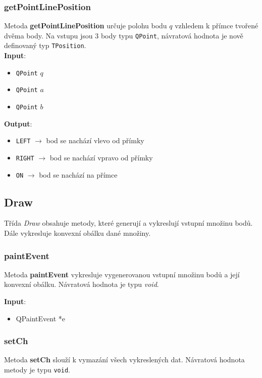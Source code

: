 \documentclass[a4paper, 12pt]{article}
\begin{document}
\subsubsection{getPointLinePosition}
Metoda \textbf{getPointLinePosition} určuje polohu bodu $q$ vzhledem k přímce tvořené dvěma body. Na vstupu jsou 3 body typu \texttt{QPoint}, návratová hodnota je nově definovaný typ \texttt{TPosition}.\\

\textbf{Input}:
\begin{itemize}
\item \texttt{QPoint} $q$
\item \texttt{QPoint} $a$
\item \texttt{QPoint} $b$
\end{itemize}

\textbf{Output}:
\begin{itemize}
\item \texttt{LEFT} $\rightarrow$ bod se nachází vlevo od přímky
\item \texttt{RIGHT} $\rightarrow$ bod se nachází vpravo od přímky
\item \texttt{ON} $\rightarrow$ bod se nachází na přímce
\end{itemize}

\subsection{Draw}
Třída \textit{Draw} obsahuje metody, které generují a vykreslují vstupní množinu bodů. Dále vykresluje konvexní obálku dané množiny. 

\subsubsection{paintEvent}
Metoda \textbf{paintEvent} vykresluje vygenerovanou vstupní množinu bodů a její konvexní obálku. Návratová hodnota je typu \textit{void}.

\textbf{Input}:
\begin{itemize}
\item QPaintEvent *e
\end{itemize}

\subsubsection{setCh}
Metoda \textbf{setCh} slouží k vymazání všech vykreslených dat. Návratová hodnota metody je typu \texttt{void}.
\end{document}

